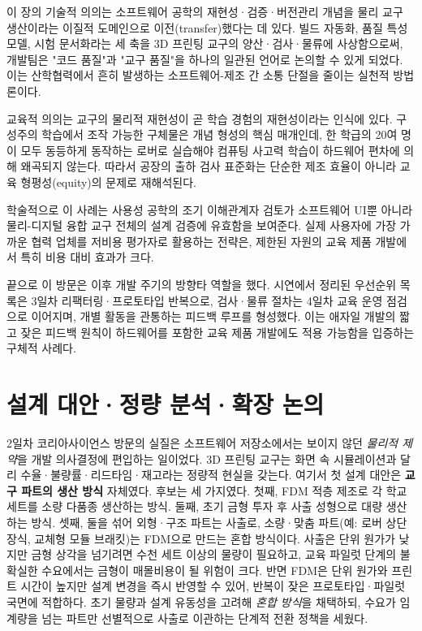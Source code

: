 이 장의 기술적 의의는 소프트웨어 공학의 재현성·검증·버전관리 개념을 물리 교구 생산이라는 이질적 도메인으로 이전(transfer)했다는 데 있다. 빌드 자동화\cite{ares-repo}, 품질 특성 모델\cite{iso25010}, 시험 문서화\cite{ieee829}라는 세 축을 3D 프린팅 교구의 양산·검사·물류에 사상함으로써, 개발팀은 "코드 품질"과 "교구 품질"을 하나의 일관된 언어로 논의할 수 있게 되었다. 이는 산학협력에서 흔히 발생하는 소프트웨어-제조 간 소통 단절을 줄이는 실천적 방법론이다.

교육적 의의는 교구의 물리적 재현성이 곧 학습 경험의 재현성이라는 인식에 있다. 구성주의 학습에서 조작 가능한 구체물은 개념 형성의 핵심 매개인데\cite{papert1980}, 한 학급의 20여 명이 모두 동등하게 동작하는 로버로 실습해야 컴퓨팅 사고력 학습\cite{wing2006ct, brennan2012ct}이 하드웨어 편차에 의해 왜곡되지 않는다. 따라서 공장의 출하 검사 표준화는 단순한 제조 효율이 아니라 교육 형평성(equity)의 문제로 재해석된다.

학술적으로 이 사례는 사용성 공학의 조기 이해관계자 검토\cite{nielsen1994heuristics, krug2014dontmakemethink}가 소프트웨어 UI뿐 아니라 물리-디지털 융합 교구 전체의 설계 검증에 유효함을 보여준다. 실제 사용자에 가장 가까운 협력 업체를 저비용 평가자로 활용하는 전략은, 제한된 자원의 교육 제품 개발에서 특히 비용 대비 효과가 크다.

끝으로 이 방문은 이후 개발 주기의 방향타 역할을 했다. 시연에서 정리된 우선순위 목록은 3일차 리팩터링·프로토타입 반복으로, 검사·물류 절차는 4일차 교육 운영 점검으로 이어지며, 개별 활동을 관통하는 피드백 루프\cite{hunt1999pragmatic}를 형성했다. 이는 애자일 개발의 짧고 잦은 피드백 원칙이 하드웨어를 포함한 교육 제품 개발에도 적용 가능함을 입증하는 구체적 사례다.





\section{설계 대안·정량 분석·확장 논의}

2일차 코리아사이언스 방문의 실질은 소프트웨어 저장소에서는 보이지 않던 \emph{물리적 제약}을 개발 의사결정에 편입하는 일이었다. 3D 프린팅 교구는 화면 속 시뮬레이션과 달리 수율·불량률·리드타임·재고라는 정량적 현실을 갖는다. 여기서 첫 설계 대안은 \textbf{교구 파트의 생산 방식} 자체였다. 후보는 세 가지였다. 첫째, FDM 적층 제조로 각 학교 세트를 소량 다품종 생산하는 방식. 둘째, 초기 금형 투자 후 사출 성형으로 대량 생산하는 방식. 셋째, 둘을 섞어 외형·구조 파트는 사출로, 소량·맞춤 파트(예: 로버 상단 장식, 교체형 모듈 브래킷)는 FDM으로 만드는 혼합 방식이다. 사출은 단위 원가가 낮지만 금형 상각을 넘기려면 수천 세트 이상의 물량이 필요하고, 교육 파일럿 단계의 불확실한 수요에서는 금형이 매몰비용이 될 위험이 크다. 반면 FDM은 단위 원가와 프린트 시간이 높지만 설계 변경을 즉시 반영할 수 있어, 반복이 잦은 프로토타입·파일럿 국면에 적합하다. 초기 물량과 설계 유동성을 고려해 \emph{혼합 방식}을 채택하되, 수요가 임계량을 넘는 파트만 선별적으로 사출로 이관하는 단계적 전환 정책을 세웠다.

